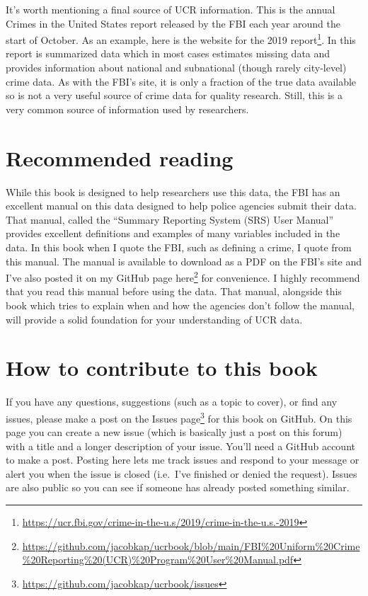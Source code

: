 \documentclass[
]{krantz}
\renewcommand{\href}[2]{#2\footnote{\url{#1}}}
\begin{document}
It's worth mentioning a final source of UCR information.
This is the annual Crimes in the United States report
released by the FBI each year around the start of October.
As an example, here is the
\href{https://ucr.fbi.gov/crime-in-the-u.s/2019/crime-in-the-u.s.-2019}{website
for the 2019 report}. In this report is summarized data
which in most cases estimates missing data and provides
information about national and subnational (though rarely
city-level) crime data. As with the FBI's site, it is only a
fraction of the true data available so is not a very useful
source of crime data for quality research. Still, this is a
very common source of information used by researchers.

\section{Recommended reading}\label{recommended-reading}

While this book is designed to help researchers use this
data, the FBI has an excellent manual on this data designed
to help police agencies submit their data. That manual,
called the ``Summary Reporting System (SRS) User Manual''
provides excellent definitions and examples of many
variables included in the data. In this book when I quote
the FBI, such as defining a crime, I quote from this manual.
The manual is available to download as a PDF on the FBI's
site and I've also posted it on my GitHub page
\href{https://github.com/jacobkap/ucrbook/blob/main/FBI\%20Uniform\%20Crime\%20Reporting\%20(UCR)\%20Program\%20User\%20Manual.pdf}{here}
for convenience. I highly recommend that you read this
manual before using the data. That manual, alongside this
book which tries to explain when and how the agencies don't
follow the manual, will provide a solid foundation for your
understanding of UCR data.

\section{How to contribute to this
book}\label{how-to-contribute-to-this-book}

If you have any questions, suggestions (such as a topic to
cover), or find any issues, please make a post on the
\href{https://github.com/jacobkap/ucrbook/issues}{Issues
page} for this book on GitHub. On this page you can create a
new issue (which is basically just a post on this forum)
with a title and a longer description of your issue. You'll
need a GitHub account to make a post. Posting here lets me
track issues and respond to your message or alert you when
the issue is closed (i.e.~I've finished or denied the
request). Issues are also public so you can see if someone
has already posted something similar.
\end{document}

